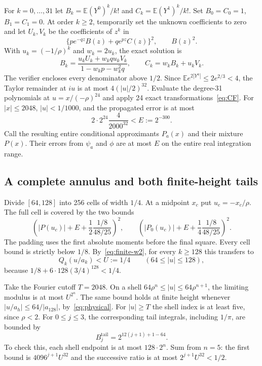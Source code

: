 \documentclass[11pt]{article}
\newcommand{\E}{\mathbb E}
\begin{document}
For $k=0,\ldots,31$ let $B_k=\E(Y^0)^k/k!$ and
$C_k=\E(Y^1)^k/k!$. Set $B_0=C_0=1$, $B_1=C_1=0$.
At order $k\ge2$, temporarily set the unknown coefficients to zero
and let $U_k,V_k$ be the coefficients of $z^k$ in
\[
 \{p e^{-qz}B(z)+q e^{pz}C(z)\}^2,\qquad B(z)^2.
\]
With $u_k=(-1/\rho)^k$ and $w_k=2u_k$, the exact solution is
\[
 B_k=\frac{u_kU_k+w_kq u_kV_k}{1-w_kp-w_k^2q},\qquad
 C_k=w_kB_k+u_kV_k.
\]
The verifier encloses every denominator above $1/2$.
Since $\E e^{2|Y^a|}\le2e^{2/3}<4$, the Taylor remainder at $iu$ is
at most $4(|u|/2)^{32}$.
Evaluate the degree-31 polynomials at $u=x/(-\rho)^{24}$ and apply
24 exact transformations~\eqref{eq:CF}. For $|x|\le2048$,
$|u|<1/1000$, and the propagated error is at most
\[
 2\cdot2^{24}\frac4{2000^{32}}<E:=2^{-300}.
\]
Call the resulting entire conditional approximants $P_a(x)$ and their
mixture $P(x)$. Their errors from $\psi_a$ and $\phi$ are at most $E$
on the entire real integration range.

\subsection{A complete annulus and both finite-height tails}
Divide $[64,128]$ into 256 cells of width $1/4$. At a midpoint $x_c$
put $u_c=-x_c/\rho$. The full cell is covered by the two bounds
\begin{equation}\label{eq:cellbounds}
 \left(|P(u_c)|+E+\frac12\frac{1/8}{48/25}\right)^2,\qquad
 \left(|P_0(u_c)|+E+\frac14\frac{1/8}{48/25}\right)^2.
\end{equation}
The padding uses the first absolute moments before the final square.
Every cell bound is strictly below $1/8$.
By~\eqref{eq:finite-w2}, for every $k\ge128$ this transfers to
\[
 Q_k(u/a_k)<U:=1/4\qquad(64\le|u|\le128),
\]
because $1/8+6\cdot128(3/4)^{128}<1/4$.

Take the Fourier cutoff $T=2048$. On a shell
$64\rho^n\le|u|\le64\rho^{n+1}$, the limiting modulus is at most
$U^{2^n}$. The same bound holds at finite height whenever
$|u/a_h|\le64/|a_{128}|$, by~\eqref{eq:physical}.
For $|u|\ge T$ the shell index is at least five, since $\rho<2$.
For $0\le j\le3$, the corresponding tail integrals, including $1/\pi$,
are bounded by
\begin{equation}\label{eq:explicit-tails}
 B_j^{\mathrm{tail}}=2^{12(j+1)+1-64}.
\end{equation}
To check this, each shell endpoint is at most $128\cdot2^n$.
Sum from $n=5$: the first bound is $4096^{j+1}U^{32}$ and the
successive ratio is at most $2^{j+1}U^{32}<1/2$.
\end{document}
